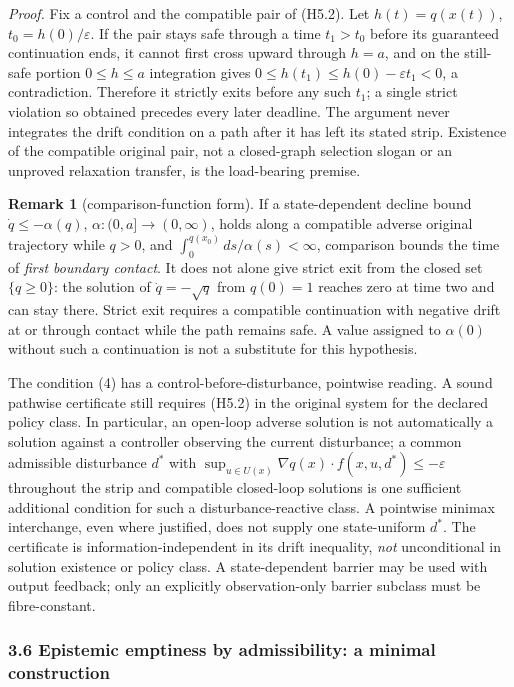 \documentclass[10pt,twocolumn]{article}
\theoremstyle{definition}
\newtheorem{remark}{Remark}
\begin{document}
\emph{Proof.} Fix a control and the compatible pair of (H5.2). Let \(h(t)=q(x(t))\), \(t_0=h(0)/\varepsilon\). If the pair stays safe through a time \(t_1>t_0\) before its guaranteed continuation ends, it cannot first cross upward through \(h=a\), and on the still-safe portion \(0\le h\le a\) integration gives \(0\le h(t_1)\le h(0)-\varepsilon t_1<0\), a contradiction. Therefore it strictly exits before any such \(t_1\); a single strict violation so obtained precedes every later deadline. The argument never integrates the drift condition on a path after it has left its stated strip. Existence of the compatible original pair, not a closed-graph selection slogan or an unproved relaxation transfer, is the load-bearing premise.

\begin{remark}[comparison-function form]\label{calc-rem:comparison}
If a state-dependent decline bound \(\dot q\le-\alpha(q)\), \(\alpha:(0,a]\to(0,\infty)\), holds along a compatible adverse original trajectory while \(q>0\), and \(\int_0^{q(x_0)}ds/\alpha(s)<\infty\), comparison bounds the time of \emph{first boundary contact}. It does not alone give strict exit from the closed set \(\{q\ge0\}\): the solution of \(\dot q=-\sqrt q\) from \(q(0)=1\) reaches zero at time two and can stay there. Strict exit requires a compatible continuation with negative drift at or through contact while the path remains safe. A value assigned to \(\alpha(0)\) without such a continuation is not a substitute for this hypothesis.
\end{remark}

The condition (4) has a control-before-disturbance, pointwise reading. A sound pathwise certificate still requires (H5.2) in the original system for the declared policy class. In particular, an open-loop adverse solution is not automatically a solution against a controller observing the current disturbance; a common admissible disturbance \(d^*\) with \(\sup_{u\in U(x)}\nabla q(x)\cdot f(x,u,d^*)\le-\varepsilon\) throughout the strip and compatible closed-loop solutions is one sufficient additional condition for such a disturbance-reactive class. A pointwise minimax interchange, even where justified, does not supply one state-uniform \(d^*\). The certificate is information-independent in its drift inequality, \emph{not} unconditional in solution existence or policy class. A state-dependent barrier may be used with output feedback; only an explicitly observation-only barrier subclass must be fibre-constant.

\subsubsection{3.6 Epistemic emptiness by admissibility: a minimal
construction}\label{calc-epistemic-emptiness-by-admissibility-a-minimal-construction}
\end{document}
